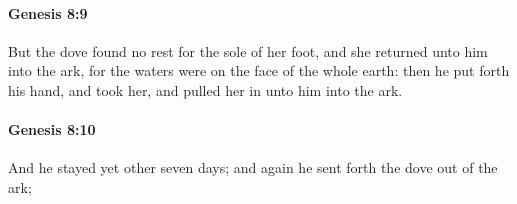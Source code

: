 		\paragraph{Genesis 8:9} %
			\label{GENESIS-8-9}

			But the dove found no rest for the sole of her foot, and she returned unto him into the ark, for the waters were on the face of the whole earth: then he put forth his hand, and took her, and pulled her in unto him into the ark.


		\paragraph{Genesis 8:10} %
			\label{GENESIS-8-10}

			And he stayed yet other seven days; and again he sent forth the dove out of the ark;


